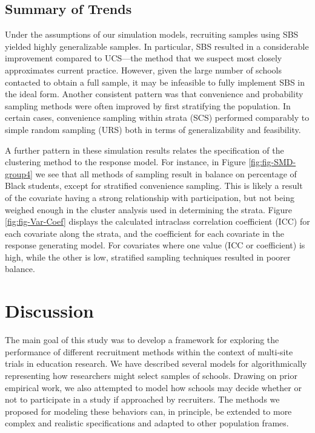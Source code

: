 \documentclass[
  english,
  man,floatsintext]{apa6}
\begin{document}
\hypertarget{summary-of-trends}{%
\subsection{Summary of Trends}\label{summary-of-trends}}

Under the assumptions of our simulation models, recruiting samples using SBS yielded highly generalizable samples. In particular, SBS resulted in a considerable improvement compared to UCS---the method that we suspect most closely approximates current practice. However, given the large number of schools contacted to obtain a full sample, it may be infeasible to fully implement SBS in the ideal form. Another consistent pattern was that convenience and probability sampling methods were often improved by first stratifying the population. In certain cases, convenience sampling within strata (SCS) performed comparably to simple random sampling (URS) both in terms of generalizability and feasibility.

A further pattern in these simulation results relates the specification of the clustering method to the response model. For instance, in Figure \ref{fig:fig-SMD-group4} we see that all methods of sampling result in balance on percentage of Black students, except for stratified convenience sampling. This is likely a result of the covariate having a strong relationship with participation, but not being weighed enough in the cluster analysis used in determining the strata. Figure \ref{fig:fig-Var-Coef} displays the calculated intraclass correlation coefficient (ICC) for each covariate along the strata, and the coefficient for each covariate in the response generating model. For covariates where one value (ICC or coefficient) is high, while the other is low, stratified sampling techniques resulted in poorer balance.

\hypertarget{discussion}{%
\section{Discussion}\label{discussion}}

The main goal of this study was to develop a framework for exploring the performance of different recruitment methods within the context of multi-site trials in education research. We have described several models for algorithmically representing how researchers might select samples of schools. Drawing on prior empirical work, we also attempted to model how schools may decide whether or not to participate in a study if approached by recruiters. The methods we proposed for modeling these behaviors can, in principle, be extended to more complex and realistic specifications and adapted to other population frames.
\end{document}
